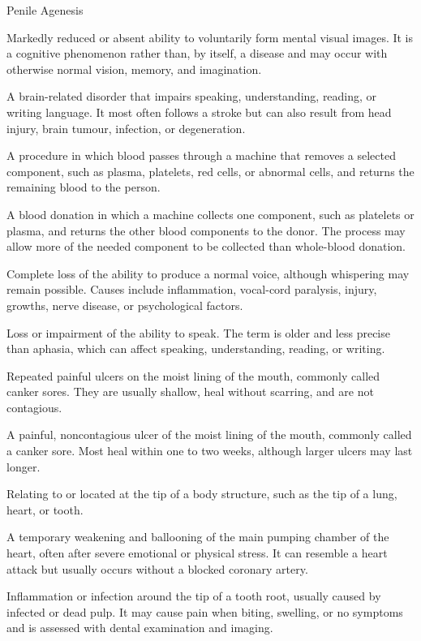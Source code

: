 \synonyms
Penile Agenesis

 Markedly reduced or absent ability to voluntarily form mental visual images. It is a cognitive phenomenon rather than, by itself, a disease and may occur with otherwise normal vision, memory, and imagination.

 A brain-related disorder that impairs speaking, understanding, reading, or writing language. It most often follows a stroke but can also result from head injury, brain tumour, infection, or degeneration.

 A procedure in which blood passes through a machine that removes a selected component, such as plasma, platelets, red cells, or abnormal cells, and returns the remaining blood to the person.

 A blood donation in which a machine collects one component, such as platelets or plasma, and returns the other blood components to the donor. The process may allow more of the needed component to be collected than whole-blood donation.

 Complete loss of the ability to produce a normal voice, although whispering may remain possible. Causes include inflammation, vocal-cord paralysis, injury, growths, nerve disease, or psychological factors.

 Loss or impairment of the ability to speak. The term is older and less precise than aphasia, which can affect speaking, understanding, reading, or writing.

 Repeated painful ulcers on the moist lining of the mouth, commonly called canker sores. They are usually shallow, heal without scarring, and are not contagious.

 A painful, noncontagious ulcer of the moist lining of the mouth, commonly called a canker sore. Most heal within one to two weeks, although larger ulcers may last longer.

 Relating to or located at the tip of a body structure, such as the tip of a lung, heart, or tooth.

 A temporary weakening and ballooning of the main pumping chamber of the heart, often after severe emotional or physical stress. It can resemble a heart attack but usually occurs without a blocked coronary artery.

 Inflammation or infection around the tip of a tooth root, usually caused by infected or dead pulp. It may cause pain when biting, swelling, or no symptoms and is assessed with dental examination and imaging.

